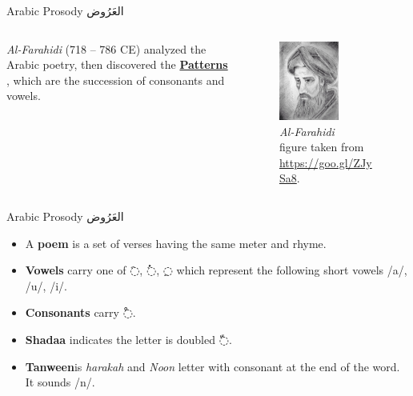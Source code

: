 \begin{frame}[fragile]{Arabic Prosody \textarabic{العَرُوض}}
\begin{columns}
\begin{column}{0.6\textwidth}
  \textit{Al-Farahidi} (718 – 786 CE) analyzed the Arabic poetry, then discovered the \alert{\underline{\textbf{Patterns}}} , which are the succession of consonants and vowels.
\end{column}
\begin{column}{0.4\textwidth}
		\begin{figure}
			\begin{center}
				\includegraphics[width=0.6\textwidth]{Figures/Al-Farahidi.jpg}
				\caption{\textit{Al-Farahidi}\\
{\tiny figure taken from \url{https://goo.gl/ZJySa8}}.}
			\end{center}
		\end{figure}
\end{column}
\end{columns}
\end{frame}

\begin{frame}[fragile]{Arabic Prosody \textarabic{العَرُوض}}

\begin{itemize}
	\item<1-> A \textbf{poem } is a set of verses having the same meter and rhyme.
	\item<2-> \textbf{Vowels}  carry one of \textarabic{◌َ,  ◌ُ,  ◌ِ} which represent the following short vowels /a/, /u/, /i/.
	\item<3-> \textbf{Consonants} carry \textarabic{◌ْ}.
	\item<4-> \textbf{Shadaa} indicates the letter is doubled \textarabic{◌ّ}.
	\item<5-> \textbf{Tanween}is  \textit{harakah} and \textit{Noon} letter with consonant at the end of the word. It sounds /n/.

\end{itemize}

\end{frame}



